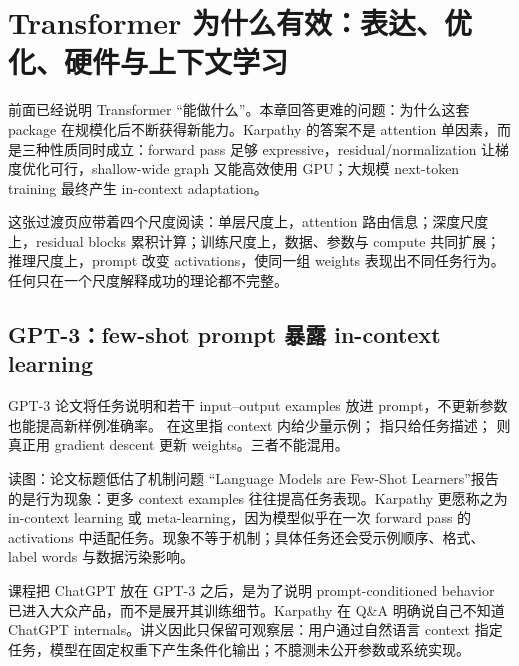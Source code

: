 \section{Transformer 为什么有效：表达、优化、硬件与上下文学习}

前面已经说明 Transformer “能做什么”。本章回答更难的问题：为什么这套 package 在规模化后不断获得新能力。Karpathy 的答案不是 attention 单因素，而是三种性质同时成立：forward pass 足够 expressive，residual/normalization 让梯度优化可行，shallow-wide graph 又能高效使用 GPU；大规模 next-token training 最终产生 in-context adaptation。


这张过渡页应带着四个尺度阅读：单层尺度上，attention 路由信息；深度尺度上，residual blocks 累积计算；训练尺度上，数据、参数与 compute 共同扩展；推理尺度上，prompt 改变 activations，使同一组 weights 表现出不同任务行为。任何只在一个尺度解释成功的理论都不完整。

\subsection{GPT-3：few-shot prompt 暴露 in-context learning}

GPT-3 论文将任务说明和若干 input--output examples 放进 prompt，不更新参数也能提高新样例准确率。 在这里指 context 内给少量示例； 指只给任务描述； 则真正用 gradient descent 更新 weights。三者不能混用。


\begin{knowledgebox}{读图：论文标题低估了机制问题}
“Language Models are Few-Shot Learners”报告的是行为现象：更多 context examples 往往提高任务表现。Karpathy 更愿称之为 in-context learning 或 meta-learning，因为模型似乎在一次 forward pass 的 activations 中适配任务。现象不等于机制；具体任务还会受示例顺序、格式、label words 与数据污染影响。
\end{knowledgebox}


课程把 ChatGPT 放在 GPT-3 之后，是为了说明 prompt-conditioned behavior 已进入大众产品，而不是展开其训练细节。Karpathy 在 Q\&A 明确说自己不知道 ChatGPT internals。讲义因此只保留可观察层：用户通过自然语言 context 指定任务，模型在固定权重下产生条件化输出；不臆测未公开参数或系统实现。

